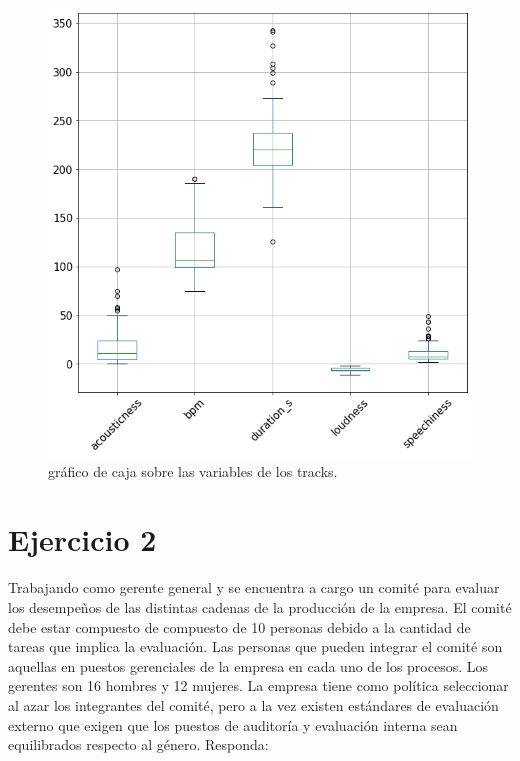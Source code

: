 \documentclass{article}
\begin{document}
\begin{figure}[h]
  \centering
  \includegraphics[scale=0.4]{g}
  \caption{gráfico de caja sobre las variables de los tracks.}
\end{figure}

\newpage
\section{Ejercicio 2}
Trabajando como gerente general y se encuentra a cargo un comité para evaluar
los desempeños de las distintas cadenas de la producción de la empresa. El
comité debe estar compuesto de compuesto de 10 personas debido a la cantidad de
tareas que implica la evaluación. Las personas que pueden integrar el comité son
aquellas en puestos gerenciales de la empresa en cada uno de los procesos. Los
gerentes son 16 hombres y 12 mujeres. La empresa tiene como política seleccionar
al azar los integrantes del comité, pero a la vez existen estándares de
evaluación externo que exigen que los puestos de auditoría y evaluación interna
sean equilibrados respecto al género. Responda:
\end{document}
